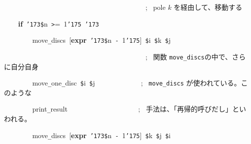 \documentclass[a4paper,10pt]{article}
\def\mc{\relax}
\begin{document}
\noindent
\mbox{}{\tt\mc \ }{\tt\mc \ }{\tt\mc \ }{\tt\mc \ }{\tt\mc \ }{\tt\mc \ }{\tt\mc \ }{\tt\mc \ }{\tt\mc \ }{\tt\mc \ }{\tt\mc \ }{\tt\mc \ }{\tt\mc \ }{\tt\mc \ }{\tt\mc \ }{\tt\mc \ }{\tt\mc \ }{\tt\mc \ }{\tt\mc \ }{\tt\mc \ }{\tt\mc \ }{\tt\mc \ }{\tt\mc \ }{\tt\mc \ }{\tt\mc \ }{\tt\mc \ }{\tt\mc \ }{\tt\mc \ }{\tt\mc \ }{\tt\mc \ }{\tt\mc \ }{\tt\mc \ }{\tt\mc \ }{\tt\mc \ }{\tt\mc \ }{\tt\mc \ }{\tt\mc \ }{\tt\mc \ }{\tt\mc \ }{\tt\mc \ };\rm\mc {\tt\#} \ pole $k$ を経由して、移動する\hfill 
\tt\mc 

\noindent
\mbox{}{\tt\mc \ }{\tt\mc \ }{\tt\mc \ }{\tt\mc \ }\textbf{if}{\tt\mc \ }{\tt\char'173}{\tt\$}n{\tt\mc \ }{\tt >}={\tt\mc \ }1{\tt\char'175}{\tt\mc \ }{\tt\char'173}

\noindent
\mbox{}{\tt\mc \ }{\tt\mc \ }{\tt\mc \ }{\tt\mc \ }{\tt\mc \ }{\tt\mc \ }{\tt\mc \ }{\tt\mc \ }move{\tt\_}discs{\tt\mc \ }[\textbf{expr}{\tt\mc \ }{\tt\char'173}{\tt\$}n{\tt\mc \ }{\tt -}{\tt\mc \ }1{\tt\char'175}]{\tt\mc \ }{\tt\$}i{\tt\mc \ }{\tt\$}k{\tt\mc \ }{\tt\$}j

\noindent
\mbox{}{\tt\mc \ }{\tt\mc \ }{\tt\mc \ }{\tt\mc \ }{\tt\mc \ }{\tt\mc \ }{\tt\mc \ }{\tt\mc \ }{\tt\mc \ }{\tt\mc \ }{\tt\mc \ }{\tt\mc \ }{\tt\mc \ }{\tt\mc \ }{\tt\mc \ }{\tt\mc \ }{\tt\mc \ }{\tt\mc \ }{\tt\mc \ }{\tt\mc \ }{\tt\mc \ }{\tt\mc \ }{\tt\mc \ }{\tt\mc \ }{\tt\mc \ }{\tt\mc \ }{\tt\mc \ }{\tt\mc \ }{\tt\mc \ }{\tt\mc \ }{\tt\mc \ }{\tt\mc \ }{\tt\mc \ }{\tt\mc \ }{\tt\mc \ }{\tt\mc \ }{\tt\mc \ }{\tt\mc \ }{\tt\mc \ }{\tt\mc \ };\rm\mc {\tt\#} \ 関数 {\tt move\_discs}の中で、さらに自分自身 \hfill 
\tt\mc 

\noindent
\mbox{}{\tt\mc \ }{\tt\mc \ }{\tt\mc \ }{\tt\mc \ }{\tt\mc \ }{\tt\mc \ }{\tt\mc \ }{\tt\mc \ }move{\tt\_}one{\tt\_}disc{\tt\mc \ }{\tt\$}i{\tt\mc \ }{\tt\$}j{\tt\mc \ }{\tt\mc \ }{\tt\mc \ }{\tt\mc \ }{\tt\mc \ }{\tt\mc \ }{\tt\mc \ }{\tt\mc \ }{\tt\mc \ }{\tt\mc \ }{\tt\mc \ }{\tt\mc \ }{\tt\mc \ };\rm\mc {\tt\#} \ {\tt move\_discs} が使われている。このような \hfill 
\tt\mc 

\noindent
\mbox{}{\tt\mc \ }{\tt\mc \ }{\tt\mc \ }{\tt\mc \ }{\tt\mc \ }{\tt\mc \ }{\tt\mc \ }{\tt\mc \ }print{\tt\_}result{\tt\mc \ }{\tt\mc \ }{\tt\mc \ }{\tt\mc \ }{\tt\mc \ }{\tt\mc \ }{\tt\mc \ }{\tt\mc \ }{\tt\mc \ }{\tt\mc \ }{\tt\mc \ }{\tt\mc \ }{\tt\mc \ }{\tt\mc \ }{\tt\mc \ }{\tt\mc \ }{\tt\mc \ }{\tt\mc \ }{\tt\mc \ }{\tt\mc \ };\rm\mc {\tt\#} \ 手法は、「再帰的呼びだし」といわれる。 \hfill 
\tt\mc 

\noindent
\mbox{}{\tt\mc \ }{\tt\mc \ }{\tt\mc \ }{\tt\mc \ }{\tt\mc \ }{\tt\mc \ }{\tt\mc \ }{\tt\mc \ }move{\tt\_}discs{\tt\mc \ }[\textbf{expr}{\tt\mc \ }{\tt\char'173}{\tt\$}n{\tt\mc \ }{\tt -}{\tt\mc \ }1{\tt\char'175}]{\tt\mc \ }{\tt\$}k{\tt\mc \ }{\tt\$}j{\tt\mc \ }{\tt\$}i
\end{document}
